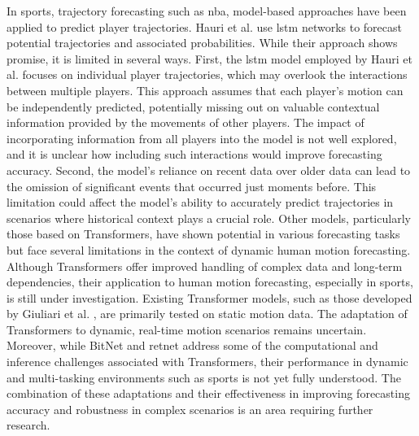 In sports, trajectory forecasting such as \gls{nba}, model-based approaches have been applied to predict player trajectories. Hauri et al. \cite{MBT} use \gls{lstm} networks to forecast potential trajectories and associated probabilities. While their approach shows promise, it is limited in several ways.
First, the \gls{lstm} model employed by Hauri et al. focuses on individual player trajectories, which may overlook the interactions between multiple players. This approach assumes that each player's motion can be independently predicted, potentially missing out on valuable contextual information provided by the movements of other players. The impact of incorporating information from all players into the model is not well explored, and it is unclear how including such interactions would improve forecasting accuracy. Second, the model's reliance on recent data over older data can lead to the omission of significant events that occurred just moments before. This limitation could affect the model's ability to accurately predict trajectories in scenarios where historical context plays a crucial role.
Other models, particularly those based on Transformers, have shown potential in various forecasting tasks but face several limitations in the context of dynamic human motion forecasting. Although Transformers offer improved handling of complex data and long-term dependencies, their application to human motion forecasting, especially in sports, is still under investigation. Existing Transformer models, such as those developed by Giuliari et al. \cite{giuliari2020transformer}, are primarily tested on static motion data. The adaptation of Transformers to dynamic, real-time motion scenarios remains uncertain.
Moreover, while BitNet \cite{BitNet2023} and \gls{retnet} \cite{RetNet} address some of the computational and inference challenges associated with Transformers, their performance in dynamic and multi-tasking environments such as sports is not yet fully understood. The combination of these adaptations and their effectiveness in improving forecasting accuracy and robustness in complex scenarios is an area requiring further research.

